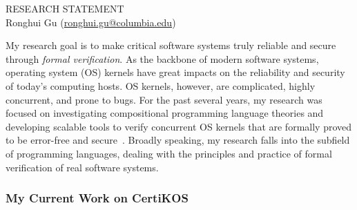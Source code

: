 \documentclass[a4paper, 10pt]{article}
\newcommand*{\email}[1]{\normalsize\href{mailto:#1}{#1}}
\begin{document}
\begin{small}

\begin{center}
{RESEARCH STATEMENT}\\
\vspace*{0.2cm}
{\normalsize Ronghui Gu (\email{ronghui.gu@columbia.edu})}
\end{center}



My research goal is to make critical software systems truly reliable and secure through \emph{formal verification}.
As the backbone of 
modern software systems,
operating system (OS) kernels
  have great impacts on the reliability and security of today's computing hosts. OS kernels, however, are complicated, highly concurrent, and prone to bugs.  For the past several years,  my research was focused on investigating compositional programming language theories and developing scalable tools to verify concurrent OS kernels that are formally proved to be error-free and secure~\cite{popl15-gu, osdi16-gu, pldi16-security, pldi16-device, cav17-yuan, oopsla17-zhai, aplas17-kim, jar-device, pldi18-gu}.
Broadly speaking, my research
falls into 
the subfield of programming languages,
dealing with the principles and practice of  formal verification
of real software systems.



\subsubsection*{\large My Current Work on CertiKOS}


\end{small}
\end{document}
